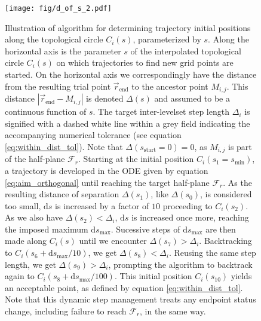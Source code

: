 \begin{figure}[h!] 
\centering
\texttt{[image: fig/d\_of\_s\_2.pdf]}
\caption{Illustration of algorithm for determining trajectory initial positions along the topological circle $C_i(s)$, parameterized by $s$. Along the horizontal axis is the parameter $s$ of the interpolated topological circle $C_i(s)$ on which trajectories to find new grid points are started. On the horizontal axis we correspondingly have the distance from the resulting trial point $\vec{r}_{\text{end}}$ to the ancestor point $M_{i,j}$. This distance $\left|\vec{r}_{\text{end}}-M_{i,j}\right|$ is denoted $\Delta(s)$ and assumed to be a continuous function of $s$. The target inter-levelset step length $\Delta_i$ is signified with a dashed white line within a grey field indicating the accompanying numerical tolerance (see equation \eqref{eq:within_dist_tol}). Note that $\Delta(s_{\text{start}}=0)=0$, as $M_{i,j}$ is part of the half-plane $\mathcal{F}_r$. Starting at the initial position $C_i(s_1=s_{\text{min}})$, a trajectory is developed in the ODE given by equation \eqref{eq:aim_orthogonal} until reaching the target half-plane $\mathcal{F}_r$. As the resulting distance of separation $\Delta(s_1)$, like $\Delta(s_0)$, is considered too small, $\text{d}s$ is increased by a factor of $10$ proceeding to $C_i(s_2)$. As we also have $\Delta(s_2)<\Delta_i$, $\text{d}s$ is increased once more, reaching the imposed maximum $\text{d}s_{\text{max}}$. Sucessive steps of $\text{d}s_{\text{max}}$ are then made along $C_i(s)$ until we encounter $\Delta(s_7)>\Delta_i$. Backtracking to $C_i(s_6+\text{d}s_{\text{max}}/10)$, we get $\Delta(s_8)<\Delta_i$. Reusing the same step length, we get $\Delta(s_9)>\Delta_i$, prompting the algorithm to backtrack again to $C_i(s_8+\text{d}s_{\text{max}}/100)$. This initial position $C_i(s_{10})$ yields an acceptable point, as defined by equation \eqref{eq:within_dist_tol}. Note that this dynamic step management treats any endpoint status change, including failure to reach $\mathcal{F}_r$, in the same way.}\label{fig:d_of_s}
\end{figure}

